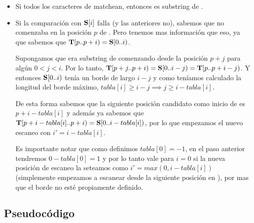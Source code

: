 \begin{itemize}
    \item Si todos los caracteres de \sS matchean, entonces \sS es substring de \sT.

    \item Si la comparación con $\textbf{S}[i]$ falla (y las anteriores no), sabemos que \sS no comenzaba en la posición $p$ de \sT. Pero tenemos mas información que eso, ya que sabemos que $\textbf{T}[p..p+i) = \textbf{S}[0..i)$.

        Supongamos que \sS era substring de \sT comenzando desde la posición $p+j$ para algún $0 < j < i$. Por lo tanto, $\textbf{T}[p+j..p+i) = \textbf{S}[0..i-j) = \textbf{T}[p..p+i-j)$. Y entonces $\textbf{S}[0..i)$ tenía un borde de largo $i-j$ y como teníamos calculado la longitud del borde máximo, $tabla[i] \geq i-j \implies j \geq i - tabla[i]$.

        De esta forma sabemos que la siguiente posición candidato como inicio de \sS es $p + i - tabla[i]$ y además ya sabemos que $\textbf{T}[p + i - tabla[i].. p+i) = \textbf{S}[0..i - tabla[i])$, por lo que empezamos el nuevo escaneo con $i' = i - tabla[i]$.

        Es importante notar que como definimos $tabla[0] = -1$, en el paso anterior tendremos $0 - tabla[0] = 1$ y por lo tanto vale para $i=0$ si la nueva posición de escaneo la seteamos como $i' = max(0, i-tabla[i])$ (simplemente empezamos a escanear \sS desde la siguiente posición en \sT), por mas que el borde no esté propiamente definido.

\end{itemize}

\subsection{Pseudocódigo}

